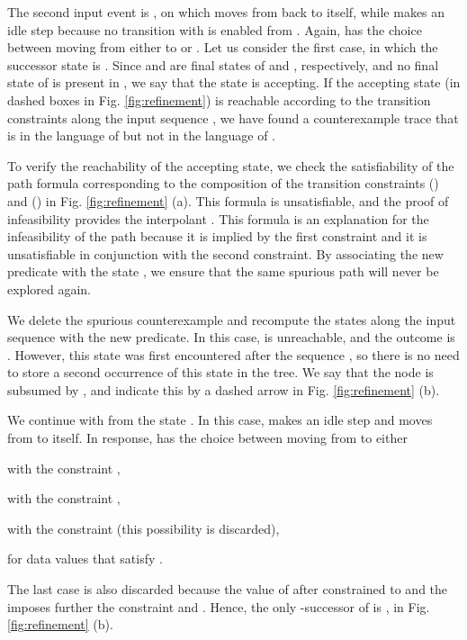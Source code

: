 \documentclass{llncs}
\begin{document}
The second input event is , on which  moves from
 back to itself, while  makes an idle step because no
transition with  is enabled from . Again,  has
the choice between moving from  either to  or
. Let us consider the first case, in which the successor
state is . Since  and
 are final states of  and , respectively, and no
final state of  is present in , we say that the state is
accepting. If the accepting state (in dashed boxes in
Fig. \ref{fig:refinement}) is reachable according to the transition
constraints along the input sequence , we
have found a counterexample trace that is in the language of
 but not in the language of .

\enlargethispage{4mm}


To verify the reachability of the accepting state, we check the
satisfiability of the path formula corresponding to the composition of
the transition constraints  () and 
() in Fig. \ref{fig:refinement} (a). This formula is
unsatisfiable, and the proof of infeasibility provides the interpolant
. This formula is an explanation for the infeasibility of
the path because it is implied by the first constraint and it is
unsatisfiable in conjunction with the second constraint. By
associating the new predicate  with the state
, we ensure that the same spurious
path will never be explored again.

We delete the spurious counterexample and recompute the states along
the input sequence  with the new
predicate. In this case,  is
unreachable, and the outcome is . However, this state was first encountered after the
sequence , so there is no need to store a second
occurrence of this state in the tree. We say that the node
 is subsumed by , and
indicate this by a dashed arrow in Fig. \ref{fig:refinement} (b).

We continue with  from the state . In this case,  makes an idle step and 
moves from  to itself. In response,  has the choice between
moving from  to either\begin{inparaenum}[(i)]
\item  with the constraint , 
\item  with the constraint , 
\item  with the constraint  (this possibility is discarded),
\item  for  data values that satisfy .
\end{inparaenum} 
The last case is also discarded because the value of  after
 constrained to  and the  imposes further the
constraint  and . Hence, the only
-successor of  is
, in Fig. \ref{fig:refinement}
(b).
\end{document}
